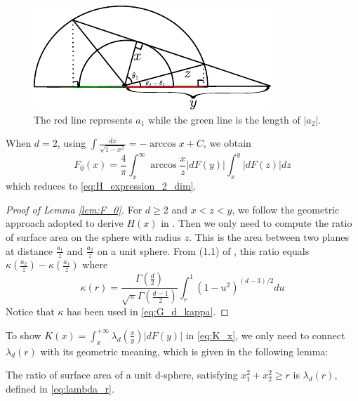 \documentclass{aptpub}
\begin{document}
\begin{figure}[!ht]
     \centering
     \includegraphics[width=0.8\textwidth]{dessin.pdf}
     \caption{The red line represents $a_1$ while the green line is the length of $|a_2|$.}
     \label{fig:a1a2}
\end{figure}
When $d=2$, using $\int \frac{dx}{\sqrt{1-x^2}} = -\arccos x + C$,
we obtain
$$
F_0(x)=\frac{4}{\pi} \int_x^{\infty} \arccos\frac{x}{z}|dF(y)|
\int_x^{y} |dF(z)|dz
$$
which reduces to \eqref{eq:H_expression_2_dim}.
\begin{proof}[Proof of Lemma \ref{lem:F_0}]
For $d\geq 2$ and $x<z<y$, we follow the geometric approach adopted to derive
$H(x)$ in \cite{carnal1970konvexe}.
Then we only need to compute the ratio of surface area
on the sphere with radius $z$. This is the area between
two planes at distance $\frac{a_1}{z}$ and $\frac{a_2}{z}$
on a unit sphere. From (1.1) of \cite{dwyer1991convex},
this ratio equals $\kappa(\frac{a_2}{z}) - \kappa(\frac{a_1}{z})$
where
\begin{equation}
     \kappa(r) = \frac{\Gamma(\frac{d}{2})}
     {\sqrt{\pi}\Gamma(\frac{d-1}{2})}\int_r^{1}
     (1-u^2)^{(d-3)/2}du
\end{equation}
Notice that $\kappa$ has been used in \eqref{eq:G_d_kappa}.
\end{proof}
To show 
$K(x) = \int_x^{+\infty} \lambda_d(\frac{x}{y})|dF(y)|$
in \eqref{eq:K_x},
we only need to connect $\lambda_d(r)$ with its geometric meaning,
which is given in the following lemma:
\begin{lemma}
     The ratio of surface area of a unit d-sphere,
     satisfying $x_1^2+x_2^2\geq r$ is $\lambda_d(r)$,
     defined in \eqref{eq:lambda_r}.
\end{lemma}
\end{document}
